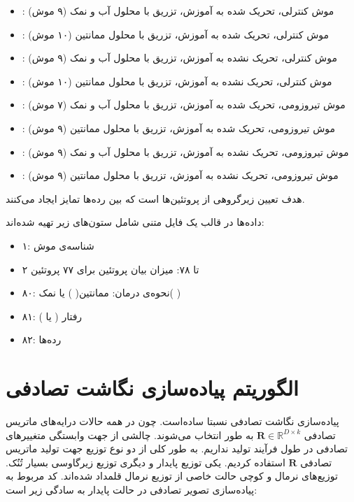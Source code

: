 \begin{itemize}
\item
{}
: موش کنترلی، تحریک شده به آموزش، تزریق با محلول آب و نمک (۹ موش)
\item
{}
: موش کنترلی، تحریک شده به آموزش، تزریق با محلول ممانتین (۱۰ موش)
\item
{}
: موش کنترلی، تحریک نشده به آموزش، تزریق با محلول آب و نمک (۹ موش)
\item
{}
: موش کنترلی، تحریک نشده به آموزش، تزریق با محلول ممانتین (۱۰ موش)
\item
{}
: موش تیروزومی، تحریک شده به آموزش، تزریق با محلول آب و نمک (۷ موش)
\item
{}
: موش تیروزومی، تحریک شده به آموزش، تزریق با محلول ممانتین (۹ موش)
\item
{}
: موش تیروزومی، تحریک نشده به آموزش، تزریق با محلول آب و نمک (۹ موش)
\item
{}
: موش تیروزومی، تحریک نشده به آموزش، تزریق با محلول ممانتین (۹ موش)
\end{itemize}

هدف تعیین زیر‌گروهی از پروتئین‌ها است که بین رده‌ها تمایز ایجاد می‌کنند.

داده‌ها در قالب یک فایل متنی شامل ستون‌های زیر تهیه شده‌اند:

\begin{itemize}
\item
۱: شناسه‌ی موش
\item
۲ تا ۷۸: میزان بیان پروتئین برای ۷۷ پروتئین
\item
۸۰: نحوه‌ی درمان: ممانتین(%
%
) یا نمک(%
%
)
\item
۸۱: رفتار (%
یا 
%
)
\item
۸۲: رده‌ها
\end{itemize}





\section{
الگوریتم پیاده‌سازی نگاشت تصادفی
}

پیاده‌سازی نگاشت تصادفی نسبتا ساده‌است. چون در همه حالات درایه‌های ماتریس تصادفی 
$\mathbf{R} \in \mathbb{R}^{D \times k}$
به طور 
انتخاب می‌شوند. چالشی از جهت وابستگی متغییر‌های تصادفی در طول فرآیند تولید نداریم. به طور کلی از دو نوع توزیع جهت تولید ماتریس تصادفی 
$\mathbf{R}$
استفاده کردیم. یکی توزیع پایدار و دیگری توزیع زیرگاوسی بسیار تُنُک. توزیع‌های نرمال و کوچی حالت خاصی از توزیع نرمال قلمداد شده‌اند.
کد مربوط به پیاده‌سازی تصویر تصادفی در حالت پایدار به سادگی زیر است:

